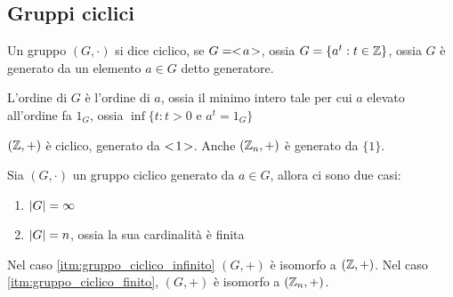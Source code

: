 \subsection{Gruppi ciclici}

\begin{defn}
Un gruppo $(G, \cdot)$ si dice ciclico, se $G = <\!{a}\!>$, ossia $G = \{ a^{t} : t \in \mathbb{Z} \}$, ossia $G$ \`e generato da un elemento $a \in G$ detto generatore.

L'ordine di $G$ \`e l'ordine di $a$, ossia il minimo intero tale per cui $a$ elevato all'ordine fa $1_G$, ossia $\inf \{ t : t > 0 \text{ e } a^t = 1_G \}$
\end{defn}

$(\mathbb{Z}, +)$ \`e ciclico, generato da $<\!{1}\!>$. Anche $(\mathbb{Z}_n, +)$ \`e generato da $\{ 1 \}$.

\begin{theorem}
Sia $(G, \cdot)$ un gruppo ciclico generato da $a \in G$, allora ci sono due casi:
\begin{enumerate}
    \item\label{itm:gruppo_ciclico_infinito} $\left\lvert{G}\right\rvert = \infty$
    \item\label{itm:gruppo_ciclico_finito} $\left\lvert{G}\right\rvert = n$, ossia la sua cardinalit\`a \`e finita
\end{enumerate}
Nel caso \ref{itm:gruppo_ciclico_infinito} $(G,+)$ \`e isomorfo a $(\mathbb{Z},+)$. Nel caso \ref{itm:gruppo_ciclico_finito}, $(G, +)$ \`e isomorfo a $(\mathbb{Z}_n, +)$.
\end{theorem}

